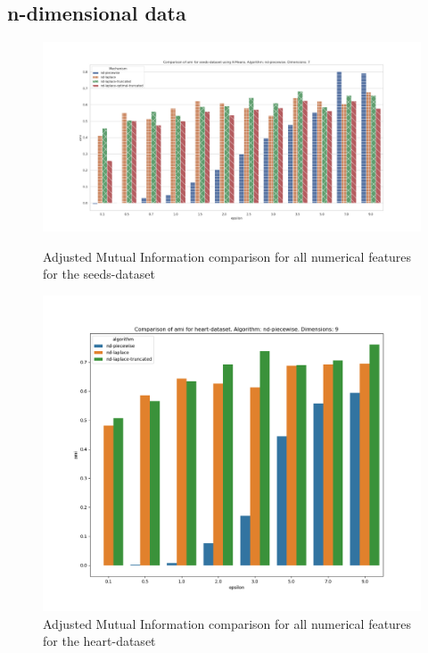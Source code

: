 \subsection{n-dimensional data}
\begin{figure}[H]
    \centering
    \begin{minipage}[c]{0.8\textwidth}
        \includegraphics[width=1\textwidth]{Results/RQ2-nd/seeds-dataset/ami_seeds-dataset_comparison.png}
        \caption{Adjusted Mutual Information comparison for all numerical features for the seeds-dataset}
        \label{fig:ami_seeds-dataset_comparison_nd}
    \end{minipage}
    \begin{minipage}[c]{0.8\textwidth}
        \includegraphics[width=1\textwidth]{Results/RQ2-nd/heart-dataset/ami_heart-dataset_comparison.png}
        \caption{Adjusted Mutual Information comparison for all numerical features for the heart-dataset}
        \label{fig:ami_heart-dataset_comparison_nd}
    \end{minipage}

\end{figure}
\newpage
